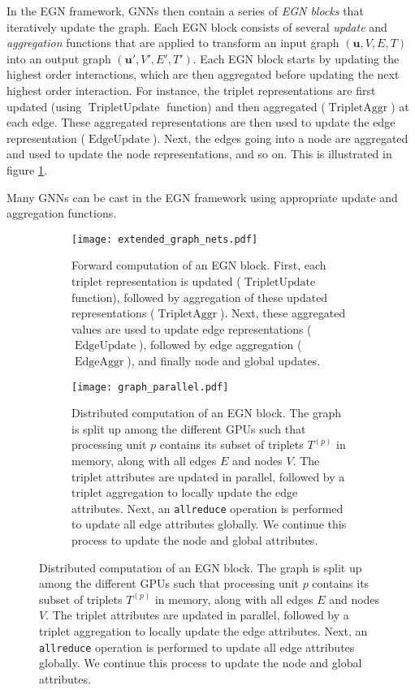 \documentclass{article} \usepackage{iclr2022_conference,times}
\newcommand{\uu}{\mathbf{u}}
\DeclareMathOperator{\TU}{TripletUpdate}
\DeclareMathOperator{\EU}{EdgeUpdate}
\DeclareMathOperator{\TA}{TripletAggr}
\DeclareMathOperator{\EA}{EdgeAggr}
\begin{document}
In the EGN framework, GNNs then contain a series of \emph{EGN blocks} that iteratively update the graph. Each EGN block consists of several \emph{update} and \emph{aggregation} functions that are applied to transform an input graph $(\uu, V, E, T)$ into an output graph $(\uu', V', E', T')$. Each EGN block starts by updating the highest order interactions, which are then aggregated before updating the next highest order interaction. For instance, the triplet representations are first updated (using $\TU$ function) and then aggregated ($\TA$) at each edge. These aggregated representations are then used to update the edge representation ($\EU$). Next, the edges going into a node are aggregated and used to update the node representations, and so on. This is illustrated in figure \ref{fig:egn_block}.











Many GNNs can be cast in the EGN framework using appropriate update and aggregation functions.





\begin{figure}[h]
\centering
    \begin{subfigure}[b]{0.9\textwidth}
        \centering
        \texttt{[image: extended\_graph\_nets.pdf]}
        \caption{Forward computation of an EGN block. First, each triplet representation is updated ($\TU$ function),
        followed by aggregation of these updated representations ($\TA$).
        Next, these aggregated values are used to update edge representations ($\EU$), followed by edge aggregation ($\EA$),
        and finally node and global updates.}
        \label{fig:egn_block}
    \end{subfigure}

    \vspace{0.2cm}
    \begin{subfigure}[b]{0.9\textwidth}
    \centering
    \texttt{[image: graph\_parallel.pdf]}
    \caption{Distributed computation of an EGN block. The graph is split up among the different GPUs such that processing unit $p$ contains its subset of triplets $T^{(p)}$ in memory, along with all edges $E$ and nodes $V$. The triplet attributes are updated in parallel, followed by a triplet aggregation to locally update the edge attributes. Next, an {\tt allreduce} operation is performed to update all edge attributes globally. We continue this process to update the node and global attributes.}
    \label{fig:graph_parallel}

    \end{subfigure}

    \label{Sequential and distributed computation of an EGN block.}
\end{figure}
\end{document}
